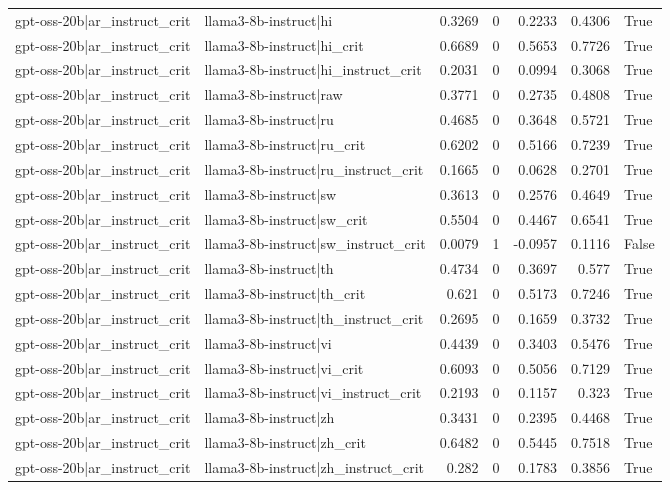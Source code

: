 \begin{table}
\begin{tabular}{l l r r r r l}
gpt-oss-20b|ar_instruct_crit & llama3-8b-instruct|hi & 0.3269 & 0 & 0.2233 & 0.4306 & True \\
gpt-oss-20b|ar_instruct_crit & llama3-8b-instruct|hi_crit & 0.6689 & 0 & 0.5653 & 0.7726 & True \\
gpt-oss-20b|ar_instruct_crit & llama3-8b-instruct|hi_instruct_crit & 0.2031 & 0 & 0.0994 & 0.3068 & True \\
gpt-oss-20b|ar_instruct_crit & llama3-8b-instruct|raw & 0.3771 & 0 & 0.2735 & 0.4808 & True \\
gpt-oss-20b|ar_instruct_crit & llama3-8b-instruct|ru & 0.4685 & 0 & 0.3648 & 0.5721 & True \\
gpt-oss-20b|ar_instruct_crit & llama3-8b-instruct|ru_crit & 0.6202 & 0 & 0.5166 & 0.7239 & True \\
gpt-oss-20b|ar_instruct_crit & llama3-8b-instruct|ru_instruct_crit & 0.1665 & 0 & 0.0628 & 0.2701 & True \\
gpt-oss-20b|ar_instruct_crit & llama3-8b-instruct|sw & 0.3613 & 0 & 0.2576 & 0.4649 & True \\
gpt-oss-20b|ar_instruct_crit & llama3-8b-instruct|sw_crit & 0.5504 & 0 & 0.4467 & 0.6541 & True \\
gpt-oss-20b|ar_instruct_crit & llama3-8b-instruct|sw_instruct_crit & 0.0079 & 1 & -0.0957 & 0.1116 & False \\
gpt-oss-20b|ar_instruct_crit & llama3-8b-instruct|th & 0.4734 & 0 & 0.3697 & 0.577 & True \\
gpt-oss-20b|ar_instruct_crit & llama3-8b-instruct|th_crit & 0.621 & 0 & 0.5173 & 0.7246 & True \\
gpt-oss-20b|ar_instruct_crit & llama3-8b-instruct|th_instruct_crit & 0.2695 & 0 & 0.1659 & 0.3732 & True \\
gpt-oss-20b|ar_instruct_crit & llama3-8b-instruct|vi & 0.4439 & 0 & 0.3403 & 0.5476 & True \\
gpt-oss-20b|ar_instruct_crit & llama3-8b-instruct|vi_crit & 0.6093 & 0 & 0.5056 & 0.7129 & True \\
gpt-oss-20b|ar_instruct_crit & llama3-8b-instruct|vi_instruct_crit & 0.2193 & 0 & 0.1157 & 0.323 & True \\
gpt-oss-20b|ar_instruct_crit & llama3-8b-instruct|zh & 0.3431 & 0 & 0.2395 & 0.4468 & True \\
gpt-oss-20b|ar_instruct_crit & llama3-8b-instruct|zh_crit & 0.6482 & 0 & 0.5445 & 0.7518 & True \\
gpt-oss-20b|ar_instruct_crit & llama3-8b-instruct|zh_instruct_crit & 0.282 & 0 & 0.1783 & 0.3856 & True \\

\end{tabular}
\end{table}
